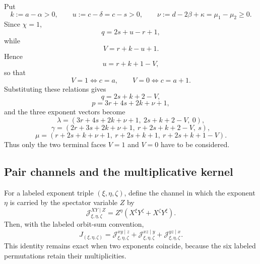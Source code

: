\documentclass[11pt]{article}
\theoremstyle{definition}
\begin{document}
Put
\begin{equation*}
k:=a-\alpha>0,
\qquad
u:=c-\delta=c-s>0,
\qquad
\nu:=d-2\beta+\kappa=\mu_1-\mu_2\ge0.
\end{equation*}
Since \(\chi=1\),
\begin{equation*}
q=2s+u-r+1,
\end{equation*}
while
\begin{equation*}
V=r+k-u+1.
\end{equation*}
Hence
\begin{equation*}
u=r+k+1-V,
\end{equation*}
so that
\begin{equation*}
V=1\iff c=a,
\qquad
V=0\iff c=a+1.
\end{equation*}
Substituting these relations gives
\begin{equation*}
q=2s+k+2-V,
\end{equation*}
\begin{equation*}
p=3r+4s+2k+\nu+1,
\end{equation*}
and the three exponent vectors become
\begin{equation*}
\lambda=
(3r+4s+2k+\nu+1,\ 2s+k+2-V,\ 0),
\end{equation*}
\begin{equation*}
\gamma=
(2r+3s+2k+\nu+1,\ r+2s+k+2-V,\ s),
\end{equation*}
\begin{equation*}
\mu=
(r+2s+k+\nu+1,\ r+2s+k+1,\ r+2s+k+1-V).
\end{equation*}
Thus only the two terminal faces \(V=1\) and \(V=0\) have to be considered.

\subsection{Pair channels and the multiplicative kernel}

For a labeled exponent triple \((\xi,\eta,\zeta)\), define the channel in which the exponent \(\eta\) is carried by the spectator variable \(Z\) by
\begin{equation*}
\mathcal J_{\xi,\eta,\zeta}^{XY\mid Z}
=
Z^\eta
\left(
X^\xi Y^\zeta+X^\zeta Y^\xi
\right).
\end{equation*}
Then, with the labeled orbit-sum convention,
\begin{equation*}
J_{(\xi,\eta,\zeta)}
=
\mathcal J_{\xi,\eta,\zeta}^{xy\mid z}
+
\mathcal J_{\xi,\eta,\zeta}^{xz\mid y}
+
\mathcal J_{\xi,\eta,\zeta}^{yz\mid x}.
\end{equation*}
This identity remains exact when two exponents coincide, because the six labeled permutations retain their multiplicities.
\end{document}
